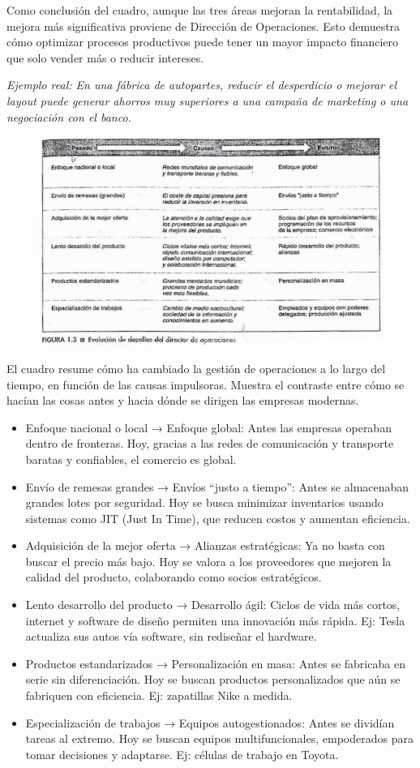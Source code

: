 \documentclass[a4paper,oneside,11pt]{article}
\begin{document}
Como conclusión del cuadro, aunque las tres áreas mejoran la rentabilidad, la mejora más significativa proviene de Dirección de Operaciones. Esto demuestra cómo optimizar procesos productivos puede tener un mayor impacto financiero que solo vender más o reducir intereses.


\textit{Ejemplo real: En una fábrica de autopartes, reducir el desperdicio o mejorar el layout puede generar ahorros muy superiores a una campaña de marketing o una negociación con el banco.}


\begin{figure} [ht!]
    \centering
    \includegraphics[width=0.75\linewidth]{pasado-futuro.png}
\end{figure}

El cuadro resume cómo ha cambiado la gestión de operaciones a lo largo del tiempo, en función de las causas impulsoras. Muestra el contraste entre cómo se hacían las cosas antes y hacia dónde se dirigen las empresas modernas.

\begin{itemize}
    \item Enfoque nacional o local → Enfoque global: Antes las empresas operaban dentro de fronteras. Hoy, gracias a las redes de comunicación y transporte baratas y confiables, el comercio es global.
    \item Envío de remesas grandes → Envíos “justo a tiempo”: Antes se almacenaban grandes lotes por seguridad. Hoy se busca minimizar inventarios usando sistemas como JIT (Just In Time), que reducen costos y aumentan eficiencia.
    \item Adquisición de la mejor oferta → Alianzas estratégicas: Ya no basta con buscar el precio más bajo. Hoy se valora a los proveedores que mejoren la calidad del producto, colaborando como socios estratégicos.
    \item Lento desarrollo del producto → Desarrollo ágil: Ciclos de vida más cortos, internet y software de diseño permiten una innovación más rápida. Ej: Tesla actualiza sus autos vía software, sin rediseñar el hardware.
    \item Productos estandarizados → Personalización en masa: Antes se fabricaba en serie sin diferenciación. Hoy se buscan productos personalizados que aún se fabriquen con eficiencia. Ej: zapatillas Nike a medida.
    \item Especialización de trabajos → Equipos autogestionados: Antes se dividían tareas al extremo. Hoy se buscan equipos multifuncionales, empoderados para tomar decisiones y adaptarse. Ej: células de trabajo en Toyota.
\end{itemize}
\end{document}
